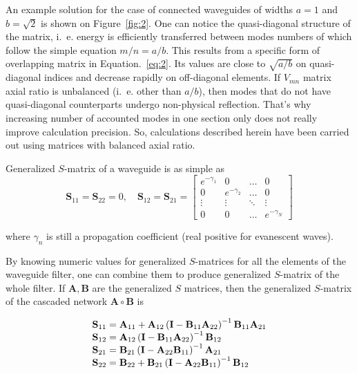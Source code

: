 \documentclass{pj}
\begin{document}
An example solution for the case of connected waveguides of widths
$a = 1$ and $b = \sqrt{2}$ is shown on
Figure~\ref{fig:2}. One can notice the quasi-diagonal
structure of the matrix, i.~e. energy is efficiently transferred
between modes numbers of which follow the simple equation $m/n =
a/b$. This results from a specific form of overlapping matrix in
Equation.~\eqref{eq:2}. Its values are close to $\sqrt{a/b}$
on quasi-diagonal indices and decrease rapidly on off-diagonal
elements. If $V_{mn}$ matrix axial ratio is unbalanced (i.~e. other than
$a/b$), then modes that do not have quasi-diagonal counterparts
undergo non-physical reflection. That's why increasing number of
accounted modes in one section only does not really improve
calculation precision. So, calculations described herein have been
carried out using matrices with balanced axial ratio.

Generalized $S$-matrix of a waveguide is as simple as
\begin{equation}
  \label{eq:4}
  \mathbf{S}_{11} = \mathbf{S}_{22} = 0, \quad
  \mathbf{S}_{12} = \mathbf{S}_{21} = 
  \begin{bmatrix}
    e^{-\gamma_1} & 0 & \dots & 0 \\
    0 & e^{-\gamma_2} & \dots & 0 \\
    \vdots & \vdots & \ddots & \vdots \\
    0 & 0 & \dots & e^{-\gamma_N}
  \end{bmatrix}
\end{equation}

where $\gamma_n$ is still a propagation coefficient (real positive for
evanescent waves).

By knowing numeric values for generalized $S$-matrices for all the
elements of the waveguide filter, one can combine them to produce
generalized $S$-matrix of the whole filter. If
$\mathbf{A}, \mathbf{B}$ are the generalized $S$ matrices, then the
generalized $S$-matrix of the cascaded network
$\mathbf{A} \circ \mathbf{B}$ is

\begin{equation}
  \begin{array}{r@{}l}
    \mathbf{S}_{11} &{}=  \mathbf{A}_{11} + \mathbf{A}_{12} \left(\mathbf{I} - \mathbf{B}_{11}\mathbf{A}_{22}\right)^{-1} \mathbf{B}_{11} \mathbf{A}_{21} \\
    \mathbf{S}_{12} &{}=  \mathbf{A}_{12} \left(\mathbf{I} - \mathbf{B}_{11}\mathbf{A}_{22}\right)^{-1} \mathbf{B}_{12} \\
    \mathbf{S}_{21} &{}=  \mathbf{B}_{21} \left(\mathbf{I} - \mathbf{A}_{22}\mathbf{B}_{11}\right)^{-1}\mathbf{A}_{21} \\
    \mathbf{S}_{22} &{}=  \mathbf{B}_{22} + \mathbf{B}_{21}\left(\mathbf{I} - \mathbf{A}_{22}\mathbf{B}_{11}\right)^{-1}\mathbf{B}_{12} \\
  \end{array}
  \label{eq:5}
\end{equation}
\end{document}
